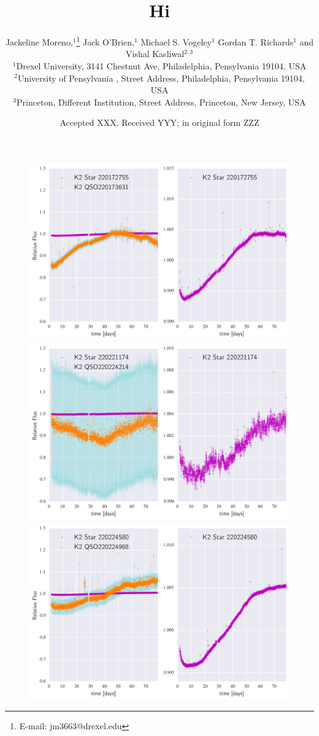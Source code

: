 \documentclass[a4paper,fleqn,usenatbib]{mnras}
\title{Hi}
\author{
	Jackeline Moreno,$^{1}$\thanks{E-mail: jm3663@drexel.edu}
	Jack O'Brien,$^{1}$
	Michael S. Vogeley$^{1}$
	Gordan T. Richards$^{1}$
	and	Vishal Kasliwal$^{2,3}$
	\\
	$^{1}$Drexel University, 3141 Chestnut Ave, Philadelphia, Pensylvania 19104, USA\\
	$^{2}$University of Pensylvania , Street Address, Philadelphia, Pensylvania 19104, USA\\
	$^{3}$Princeton, Different Institution, Street Address, Princeton, New Jersey, USA
}
\date{Accepted XXX. Received YYY; in original form ZZZ}
\begin{document}
\maketitle


 \begin{figure}
 	\includegraphics[width=\columnwidth]{220173631NearestNeighbor.png}
 	\includegraphics[width=\columnwidth]{220224214NearestNeighbor.png}
 	\includegraphics[width=\columnwidth]{220224988NearestNeighbor.png}
 	\caption{}
 	\label{fig:example_figure}
 \end{figure}
 
\end{document}
